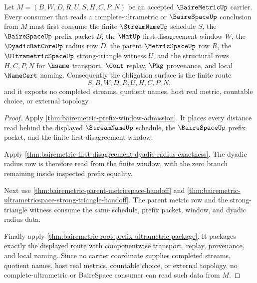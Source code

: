 \begin{theorem}
\label{thm:bairemetric-streamname-ultrametric-obligation}
Let $M=(B,W,D,R,U,S,H,C,P,N)$ be an accepted $\BaireMetricUp$ carrier. Every consumer that reads a complete-ultrametric or $\BaireSpaceUp$ conclusion from $M$ must first consume the finite $\StreamNameUp$ schedule $S$, the $\BaireSpaceUp$ prefix packet $B$, the $\NatUp$ first-disagreement window $W$, the $\DyadicRatCoreUp$ radius row $D$, the parent $\MetricSpaceUp$ row $R$, the $\UltrametricSpaceUp$ strong-triangle witness $U$, and the structural rows $H,C,P,N$ for $\hsame$ transport, $\Cont$ replay, $\Pkg$ provenance, and local $\NameCert$ naming. Consequently the obligation surface is the finite route
$$
S,B,W,D,R,U,H,C,P,N ,
$$
and it exports no completed streams, quotient names, host real metric, countable choice, or external topology.
\end{theorem}
\begin{proof}
Apply \autoref{thm:bairemetric-prefix-window-admission}. It places every distance read behind the displayed $\StreamNameUp$ schedule, the $\BaireSpaceUp$ prefix packet, and the finite first-disagreement window.

Apply \autoref{thm:bairemetric-first-disagreement-dyadic-radius-exactness}. The dyadic radius row is therefore read from the finite window, with the zero branch remaining inside inspected prefix equality.

Next use \autoref{thm:bairemetric-parent-metricspace-handoff} and \autoref{thm:bairemetric-ultrametricspace-strong-triangle-handoff}. The parent metric row and the strong-triangle witness consume the same schedule, prefix packet, window, and dyadic radius data.

Finally apply \autoref{thm:bairemetric-root-prefix-ultrametric-package}. It packages exactly the displayed route with componentwise transport, replay, provenance, and local naming. Since no carrier coordinate supplies completed streams, quotient names, host real metrics, countable choice, or external topology, no complete-ultrametric or BaireSpace consumer can read such data from $M$.
\end{proof}

